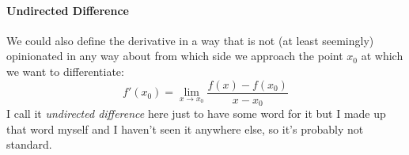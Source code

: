 
\paragraph{Undirected Difference}
We could also define the derivative in a way that is not (at least seemingly) opinionated in any way about from which side we approach the point $x_0$ at which we want to differentiate:
\begin{equation}
 f'(x_0) = \lim_{x \rightarrow x_0} \frac{f(x) - f(x_0)}{x - x_0}
\end{equation}
I call it \emph{undirected difference} here just to have some word for it but I made up that word myself and I haven't seen it anywhere else, so it's probably not standard.




